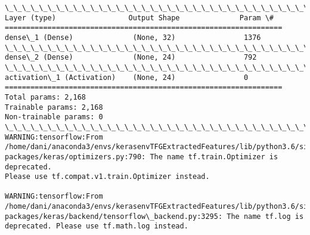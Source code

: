 \documentclass[11pt]{article}
\begin{document}
    \begin{Verbatim}[commandchars=\\\{\}]
\_\_\_\_\_\_\_\_\_\_\_\_\_\_\_\_\_\_\_\_\_\_\_\_\_\_\_\_\_\_\_\_\_\_\_\_\_\_\_\_\_\_\_\_\_\_\_\_\_\_\_\_\_\_\_\_\_\_\_\_\_\_\_\_\_
Layer (type)                 Output Shape              Param \#
=================================================================
dense\_1 (Dense)              (None, 32)                1376
\_\_\_\_\_\_\_\_\_\_\_\_\_\_\_\_\_\_\_\_\_\_\_\_\_\_\_\_\_\_\_\_\_\_\_\_\_\_\_\_\_\_\_\_\_\_\_\_\_\_\_\_\_\_\_\_\_\_\_\_\_\_\_\_\_
dense\_2 (Dense)              (None, 24)                792
\_\_\_\_\_\_\_\_\_\_\_\_\_\_\_\_\_\_\_\_\_\_\_\_\_\_\_\_\_\_\_\_\_\_\_\_\_\_\_\_\_\_\_\_\_\_\_\_\_\_\_\_\_\_\_\_\_\_\_\_\_\_\_\_\_
activation\_1 (Activation)    (None, 24)                0
=================================================================
Total params: 2,168
Trainable params: 2,168
Non-trainable params: 0
\_\_\_\_\_\_\_\_\_\_\_\_\_\_\_\_\_\_\_\_\_\_\_\_\_\_\_\_\_\_\_\_\_\_\_\_\_\_\_\_\_\_\_\_\_\_\_\_\_\_\_\_\_\_\_\_\_\_\_\_\_\_\_\_\_
WARNING:tensorflow:From
/home/dani/anaconda3/envs/kerasenvTFGExtractedFeatures/lib/python3.6/site-
packages/keras/optimizers.py:790: The name tf.train.Optimizer is deprecated.
Please use tf.compat.v1.train.Optimizer instead.

WARNING:tensorflow:From
/home/dani/anaconda3/envs/kerasenvTFGExtractedFeatures/lib/python3.6/site-
packages/keras/backend/tensorflow\_backend.py:3295: The name tf.log is
deprecated. Please use tf.math.log instead.

    \end{Verbatim}
\end{document}
